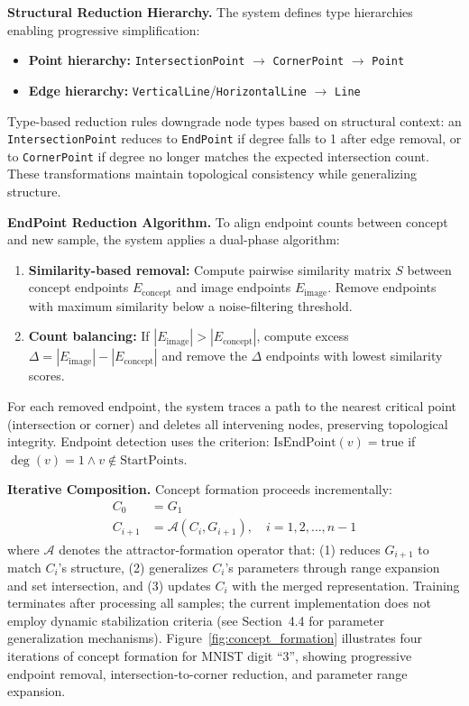 \documentclass[12pt, a4paper]{article}
\begin{document}
\textbf{Structural Reduction Hierarchy.} The system defines type hierarchies enabling progressive simplification:
\begin{itemize}
\item \textbf{Point hierarchy:} \texttt{IntersectionPoint} $\rightarrow$ \texttt{CornerPoint} $\rightarrow$ \texttt{Point}
\item \textbf{Edge hierarchy:} \texttt{VerticalLine}/\texttt{HorizontalLine} $\rightarrow$ \texttt{Line}
\end{itemize}

Type-based reduction rules downgrade node types based on structural context: an \texttt{IntersectionPoint} reduces to \texttt{EndPoint} if degree falls to 1 after edge removal, or to \texttt{CornerPoint} if degree no longer matches the expected intersection count. These transformations maintain topological consistency while generalizing structure.

\textbf{EndPoint Reduction Algorithm.} To align endpoint counts between concept and new sample, the system applies a dual-phase algorithm:
\begin{enumerate}
\item \textbf{Similarity-based removal:} Compute pairwise similarity matrix $S$ between concept endpoints $E_{\text{concept}}$ and image endpoints $E_{\text{image}}$. Remove endpoints with maximum similarity below a noise-filtering threshold.
\item \textbf{Count balancing:} If $|E_{\text{image}}| > |E_{\text{concept}}|$, compute excess $\Delta = |E_{\text{image}}| - |E_{\text{concept}}|$ and remove the $\Delta$ endpoints with lowest similarity scores.
\end{enumerate}

For each removed endpoint, the system traces a path to the nearest critical point (intersection or corner) and deletes all intervening nodes, preserving topological integrity. Endpoint detection uses the criterion: $\text{IsEndPoint}(v) = \text{true}$ if $\deg(v) = 1 \land v \notin \text{StartPoints}$.

\textbf{Iterative Composition.} Concept formation proceeds incrementally:
\begin{align*}
C_0 &= G_1 \\
C_{i+1} &= \mathcal{A}(C_i, G_{i+1}), \quad i = 1, 2, \dots, n-1
\end{align*}
where $\mathcal{A}$ denotes the attractor-formation operator that: (1) reduces $G_{i+1}$ to match $C_i$'s structure, (2) generalizes $C_i$'s parameters through range expansion and set intersection, and (3) updates $C_i$ with the merged representation. Training terminates after processing all samples; the current implementation does not employ dynamic stabilization criteria (see Section~4.4 for parameter generalization mechanisms). Figure~\ref{fig:concept_formation} illustrates four iterations of concept formation for MNIST digit ``3'', showing progressive endpoint removal, intersection-to-corner reduction, and parameter range expansion.
\end{document}
